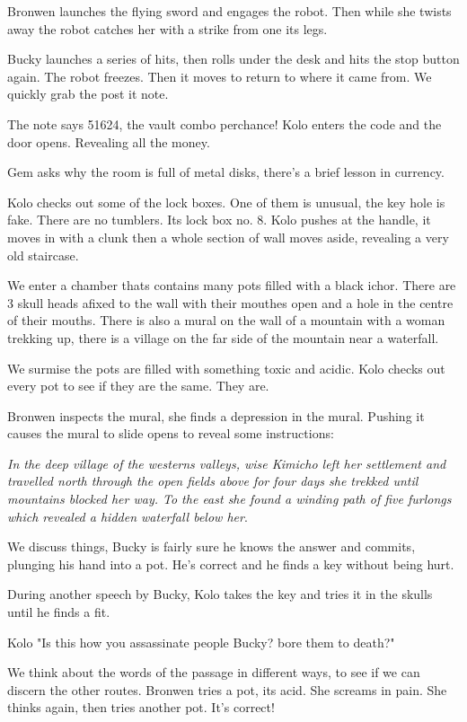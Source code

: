 Bronwen launches the flying sword and engages the robot. Then while she twists away the robot catches her with a strike from one its legs.\medskip

Bucky launches a series of hits, then rolls under the desk and hits the stop button again. The robot freezes. Then it moves to return to where it came from. We quickly grab the post it note.\medskip

The note says 51624, the vault combo perchance! Kolo enters the code and the door opens. Revealing all the money.\medskip

Gem asks why the room is full of metal disks, there's a brief lesson in currency.\medskip

Kolo checks out some of the lock boxes. One of them is unusual, the key hole is fake. There are no tumblers. Its lock box no. 8. Kolo pushes at the handle, it moves in with a clunk then a whole section of wall moves aside, revealing a very old staircase.\medskip

We enter a chamber thats contains many pots filled with a black ichor. There are 3 skull heads afixed to the wall with their mouthes open and a hole in the centre of their mouths. There is also a mural on the wall of a mountain with a woman trekking up, there is a village on the far side of the mountain near a waterfall.\medskip

We surmise the pots are filled with something toxic and acidic. Kolo checks out every pot to see if they are the same. They are.\medskip

Bronwen inspects the mural, she finds a depression in the mural. Pushing it causes the mural to slide opens to reveal some instructions:\medskip

\textit{In the deep village of the westerns valleys, wise Kimicho left her settlement and travelled north through the open fields above for four days she trekked until mountains blocked her way. To the east she found a winding path of five furlongs which revealed a hidden waterfall below her}.\medskip

We discuss things, Bucky is fairly sure he knows the answer and commits, plunging his hand into a pot. He's correct and he finds a key without being hurt.\medskip

During another speech by Bucky, Kolo takes the key and tries it in the skulls until he finds a fit.\medskip

Kolo "Is this how you assassinate people Bucky? bore them to death?"\medskip

We think about the words of the passage in different ways, to see if we can discern the other routes. Bronwen tries a pot, its acid. She screams in pain. She thinks again, then tries another pot. It's correct!\medskip

